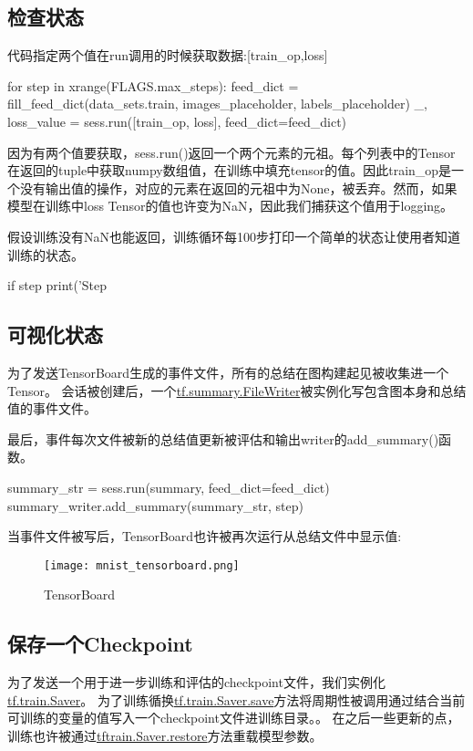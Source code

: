 \subsection{检查状态}
代码指定两个值在run调用的时候获取数据:[train\_op,loss]
\begin{pythoncode}
for step in xrange(FLAGS.max_steps):
    feed_dict = fill_feed_dict(data_sets.train,
                               images_placeholder,
                               labels_placeholder)
    _, loss_value = sess.run([train_op, loss],
                             feed_dict=feed_dict)
\end{pythoncode}
因为有两个值要获取，sess.run()返回一个两个元素的元祖。每个列表中的Tensor在返回的tuple中获取numpy数组值，在训练中填充tensor的值。因此train\_op是一个没有输出值的操作，对应的元素在返回的元祖中为None，被丢弃。然而，如果模型在训练中loss Tensor的值也许变为NaN，因此我们捕获这个值用于logging。

假设训练没有NaN也能返回，训练循环每100步打印一个简单的状态让使用者知道训练的状态。
\begin{pythoncode}
if step %
    print('Step %
\end{pythoncode}
\subsection{可视化状态}
为了发送TensorBoard生成的事件文件，所有的总结在图构建起见被收集进一个Tensor。
会话被创建后，一个\href{https://www.tensorflow.org/api_docs/python/tf/summary/FileWriter}{tf.summary.FileWriter}被实例化写包含图本身和总结值的事件文件。

最后，事件每次文件被新的总结值更新被评估和输出writer的add\_summary()函数。
\begin{pythoncode}
summary_str = sess.run(summary, feed_dict=feed_dict)
summary_writer.add_summary(summary_str, step)
\end{pythoncode}
当事件文件被写后，TensorBoard也许被再次运行从总结文件中显示值:
\begin{figure}[H]
\centering
\texttt{[image: mnist\_tensorboard.png]}
\caption{TensorBoard}
\end{figure}
\subsection{保存一个Checkpoint}
为了发送一个用于进一步训练和评估的checkpoint文件，我们实例化\href{https://www.tensorflow.org/api_docs/python/tf/train/Saver}{tf.train.Saver}。
为了训练循换\href{https://www.tensorflow.org/api_docs/python/tf/train/Saver#save}{tf.train.Saver.save}方法将周期性被调用通过结合当前可训练的变量的值写入一个checkpoint文件进训练目录。。
在之后一些更新的点，训练也许被通过\href{https://www.tensorflow.org/api_docs/python/tf/train/Saver#restore}{tftrain.Saver.restore}方法重载模型参数。\newline
{}

